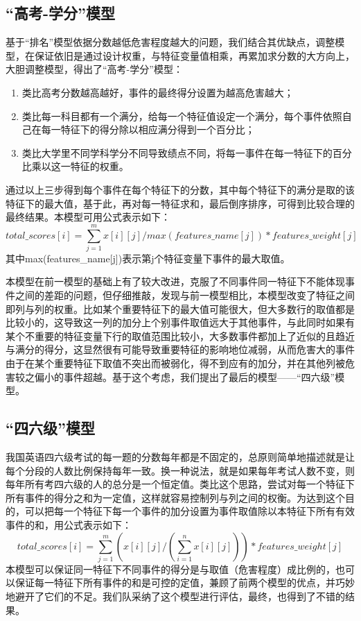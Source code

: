\documentclass{cumcmthesis}
\begin{document}
\subsection{“高考-学分”模型}
基于“排名”模型依据分数越低危害程度越大的问题，我们结合其优缺点，调整模型，在保证依旧是通过设计权重，与特征变量值相乘，再累加求分数的大方向上，大胆调整模型，得出了“高考-学分”模型：
\begin{enumerate} 
	\item 类比高考分数越高越好，事件的最终得分设置为越高危害越大；
	\item 类比每一科目都有一个满分，给每一个特征值设定一个满分，每个事件依照自己在每一特征下的得分除以相应满分得到一个百分比；
	\item 类比大学里不同学科学分不同导致绩点不同，将每一事件在每一特征下的百分比乘以这一特征的权重。
\end{enumerate} 
	通过以上三步得到每个事件在每个特征下的分数，其中每个特征下的满分是取的该特征下的最大值，基于此，再对每一特征求和，最后倒序排序，可得到比较合理的最终结果。本模型可用公式表示如下：
	 \begin{equation} 
	 total\_scores[i]=\sum_{j=1}^m x[i][j]/max(features\_name[j])*features\_weight[j] 
	\end{equation}
	其中max(features\_name[j])表示第j个特征变量下事件的最大取值。\par
	本模型在前一模型的基础上有了较大改进，克服了不同事件同一特征下不能体现事件之间的差距的问题，但仔细推敲，发现与前一模型相比，本模型改变了特征之间即列与列的权重。比如某个重要特征下的最大值可能很大，但大多数行的取值都是比较小的，这导致这一列的加分上个别事件取值远大于其他事件，与此同时如果有某个不重要的特征变量下行的取值范围比较小，大多数事件都加上了近似的且趋近与满分的得分，这显然很有可能导致重要特征的影响地位减弱，从而危害大的事件由于在某个重要特征下取值不突出而被弱化，得不到应有的加分，并在其他列被危害较之偏小的事件超越。基于这个考虑，我们提出了最后的模型——“四六级”模型。
\subsection{“四六级”模型}
	我国英语四六级考试的每一题的分数每年都是不固定的，总原则简单地描述就是让每个分段的人数比例保持每年一致。换一种说法，就是如果每年考试人数不变，则每年所有考四六级的人的总分是一个恒定值。类比这个思路，尝试对每一个特征下所有事件的得分之和为一定值，这样就容易控制列与列之间的权衡。为达到这个目的，可以把每一个特征下每一个事件的加分设置为事件取值除以本特征下所有有效事件的和，用公式表示如下：
	 \begin{equation} 
	total\_scores[i]=\sum_{j=1}^m (x[i][j]/(\sum_{i=1}^n x[i][j]))*features\_weight[j] 
	\end{equation}
	本模型可以保证同一特征下不同事件的得分是与取值（危害程度）成比例的，也可以保证每一特征下所有事件的和是可控的定值，兼顾了前两个模型的优点，并巧妙地避开了它们的不足。我们队采纳了这个模型进行评估，最终，也得到了不错的结果。
	
\end{document}
